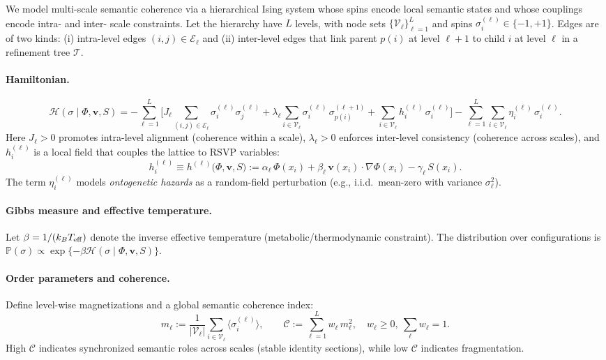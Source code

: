\documentclass[a4paper,11pt]{article}
\begin{document}
We model multi-scale semantic coherence via a hierarchical Ising system whose
spins encode local semantic states and whose couplings encode intra- and inter-
scale constraints. Let the hierarchy have $L$ levels, with node sets
$\{\mathcal{V}_\ell\}_{\ell=1}^{L}$ and spins $\sigma_i^{(\ell)}\in\{-1,+1\}$.
Edges are of two kinds: (i) intra-level edges $(i,j)\in\mathcal{E}_\ell$ and
(ii) inter-level edges that link parent $p(i)$ at level $\ell{+}1$ to child
$i$ at level $\ell$ in a refinement tree $\mathcal{T}$.

\paragraph{Hamiltonian.}
\begin{equation}
\label{eq:hier-ising-hamiltonian}
\mathcal{H}(\sigma \mid \Phi,\mathbf v,S)
=
-\sum_{\ell=1}^{L}\Bigg[
  J_\ell \!\!\!\sum_{(i,j)\in\mathcal{E}_\ell}\!\! \sigma_i^{(\ell)}\sigma_j^{(\ell)}
 +\lambda_\ell \!\!\sum_{i\in\mathcal{V}_\ell}\!\! \sigma_i^{(\ell)}\,\sigma_{p(i)}^{(\ell+1)}
 +\sum_{i\in\mathcal{V}_\ell}\! h_i^{(\ell)}\,\sigma_i^{(\ell)}
\Bigg]
-\sum_{\ell=1}^{L}\sum_{i\in\mathcal{V}_\ell}\eta_i^{(\ell)}\,\sigma_i^{(\ell)}.
\end{equation}
Here $J_\ell>0$ promotes intra-level alignment (coherence within a scale),
$\lambda_\ell>0$ enforces inter-level consistency (coherence across scales), and
$h_i^{(\ell)}$ is a local field that couples the lattice to RSVP variables:
\[
h_i^{(\ell)}\equiv h^{(\ell)}\!\big(\Phi,\mathbf v,S\big)
:= \alpha_\ell\,\Phi(x_i)
   + \beta_\ell\,\mathbf v(x_i)\!\cdot\!\nabla\Phi(x_i)
   - \gamma_\ell\,S(x_i).
\]
The term $\eta_i^{(\ell)}$ models \emph{ontogenetic hazards} as a random-field
perturbation (e.g., i.i.d.\ mean-zero with variance $\sigma_\ell^2$).

\paragraph{Gibbs measure and effective temperature.}
Let $\beta=1/(k_B T_{\rm eff})$ denote the inverse effective temperature
(metabolic/thermodynamic constraint). The distribution over configurations is
\(
\mathbb{P}(\sigma)\propto \exp\{-\beta \mathcal{H}(\sigma \mid \Phi,\mathbf v,S)\}.
\)

\paragraph{Order parameters and coherence.}
Define level-wise magnetizations and a global semantic coherence index:
\[
m_\ell := \frac{1}{|\mathcal{V}_\ell|}\sum_{i\in\mathcal{V}_\ell}\!\langle \sigma_i^{(\ell)}\rangle,
\qquad
\mathcal{C} := \sum_{\ell=1}^L w_\ell\,m_\ell^2,\quad w_\ell\ge 0,\ \sum_\ell w_\ell=1.
\]
High $\mathcal{C}$ indicates synchronized semantic roles across scales (stable
identity sections), while low $\mathcal{C}$ indicates fragmentation.
\end{document}
